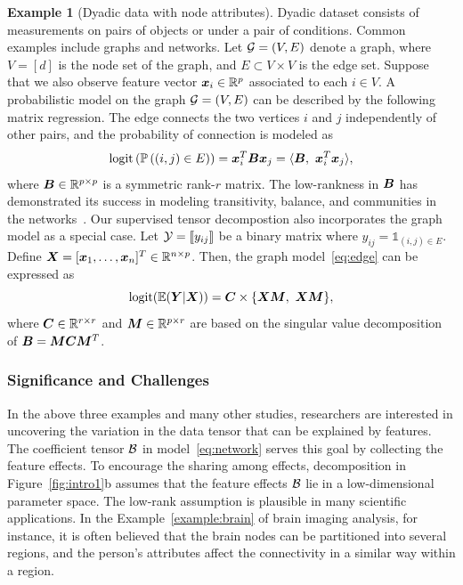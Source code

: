 \documentclass[10pt]{article}
\theoremstyle{definition}
\theoremstyle{definition}
\newtheorem{example}{Example}
\theoremstyle{definition}
\begin{document}
\begin{enumerate}
 \begin{example}[Dyadic data with node attributes] Dyadic dataset consists of measurements on pairs of objects or under a pair of conditions. Common examples include graphs and networks. Let $\mathcal{G}=(V,E)$ denote a graph, where $V=[d]$ is the node set of the graph, and $E\subset V\times V$ is the edge set. Suppose that we also observe feature vector $\bm x_i\in\mathbb{R}^p$ associated to each $i\in V$. A probabilistic model on the graph $\mathcal{G}=(V,E)$ can be described by the following matrix regression. The edge connects the two vertices $i$ and $j$ independently of other pairs, and the probability of connection is modeled as
\begin{equation}\label{eq:edge}
 \textup{logit}\left(\mathbb{P}\left((i,j)\in E\right)\right)=\mx^T_i\mB\mx_j=\langle \mB,\ \mx^T_i\mx_j\rangle,
 \end{equation}
 where $\bm B\in\mathbb{R}^{p\times p}$ is a symmetric rank-$r$ matrix. The low-rankness in $\bm B$ has demonstrated its success in modeling transitivity, balance, and communities in the networks~\cite{hoff2005bilinear}. Our supervised tensor decompostion also incorporates the graph model as a special case. Let $\mathcal{Y}=\llbracket y_{ij} \rrbracket$ be a binary matrix where $y_{ij}=\mathds{1}_{(i,j)\in E}$. Define $\bm X=[\bm x_1,\ldots,\bm x_n]^T\in\mathbb{R}^{n\times p}$. Then, the graph model~\eqref{eq:edge} can be expressed as
 \[
 \textup{logit}(\mathbb{E}(\mY|\mX))=\mC\times\{\mX\mM,\ \mX\mM\}, 
  \]
  where $\bm C\in\mathbb{R}^{r\times r}$ and $\bm M\in\mathbb{R}^{p\times r}$ are based on the singular value decomposition of $\bm B=\bm M\bm C\bm M^T$. 
  \end{example}
  

\subsubsection{Significance and Challenges}
In the above three examples and many other studies, researchers are interested in uncovering the variation in the data tensor that can be explained by features. The coefficient tensor $\mathcal{B}$ in model~\eqref{eq:network} serves this goal by collecting the feature effects. To encourage the sharing among effects, decomposition in Figure~\ref{fig:intro1}b assumes that the feature effects $\mathcal{B}$ lie in a low-dimensional parameter space. The low-rank assumption is plausible in many scientific applications. In the Example~\ref{example:brain} of brain imaging analysis, for instance, it is often believed that the brain nodes can be partitioned into several regions, and the person's attributes affect the connectivity in a similar way within a region. 


\end{enumerate}
\end{document}
